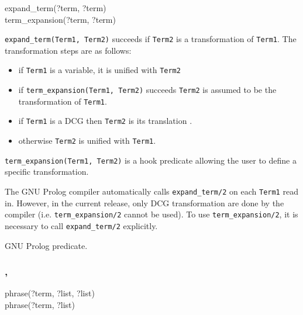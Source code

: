\begin{TemplatesOneCol}
expand\_term(?term, ?term)\\
term\_expansion(?term, ?term)

\end{TemplatesOneCol}

\Description

\texttt{expand\_term(Term1, Term2)} succeeds if
\texttt{Term2} is a transformation of \texttt{Term1}. The transformation
steps are as follows:

\begin{itemize}

\item if \texttt{Term1} is a variable, it is unified with \texttt{Term2}

\item if \texttt{term\_expansion(Term1, Term2)} succeeds \texttt{Term2} is
  assumed to be the transformation of \texttt{Term1}.

\item if \texttt{Term1} is a DCG then \texttt{Term2} is its translation
  .

\item otherwise \texttt{Term2} is unified with \texttt{Term1}.

\end{itemize}

\texttt{term\_expansion(Term1, Term2)} is a hook predicate allowing the user
to define a specific transformation.

The GNU Prolog compiler  automatically calls
\texttt{expand\_term/2} on each \texttt{Term1} read in. However, in the
current release, only DCG transformation are done by the compiler (i.e.
\texttt{term\_expansion/2} cannot be used). To use
\texttt{term\_expansion/2}, it is necessary to call \texttt{expand\_term/2}
explicitly.

\PlErrorsNone

\Portability

GNU Prolog predicate.

\subsubsection{,
               }

\begin{TemplatesOneCol}
phrase(?term, ?list, ?list)\\
phrase(?term, ?list)

\end{TemplatesOneCol}

